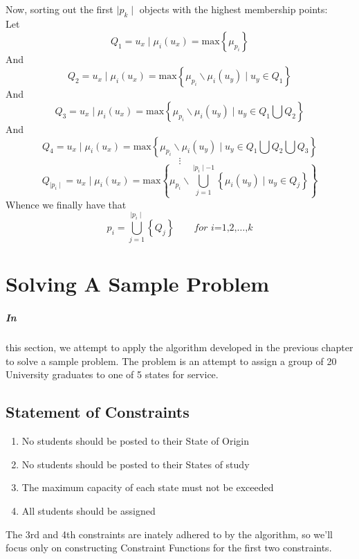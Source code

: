 \documentclass[a4paper]{book}
\begin{document}
		\paragraph{}
			Now, sorting out the first $\mid p_k \mid$ objects with the highest membership points:\\
			Let
				\begin{equation}
					Q_1 = u_x \mid \mu_i(u_x) = \text{max}\left\{ \mu_{p_i} \right\}
				\end{equation}
			And
				\begin{equation}
					Q_2 = u_x \mid \mu_i(u_x) = \text{max}\left\{ \mu_{p_i} \backslash \mu_i(u_y) \mid u_y \in Q_1 \right\}
				\end{equation}
			And
				\begin{equation}
					Q_3 = u_x \mid \mu_i(u_x) = \text{max}\left\{ \mu_{p_i} \backslash \mu_i(u_y) \mid u_y \in Q_1 \bigcup Q_2 \right\}
				\end{equation}
			And
				\begin{equation}
					Q_4 = u_x \mid \mu_i(u_x) = \text{max}\left\{ \mu_{p_i} \backslash \mu_i(u_y) \mid u_y \in Q_1 \bigcup Q_2 \bigcup Q_3 \right\}
				\end{equation}
				\[
					\vdots
				\]
				\begin{equation}
					Q_{\mid p_i \mid} = u_x \mid \mu_i(u_x) = \text{max}\left\{ \mu_{p_i} \backslash \bigcup_{j=1}^{\mid p_i \mid - 1} \left\{  \mu_i(u_y) \mid u_y \in Q_j \right\} \right\}
				\end{equation}
			Whence we finally have that
				\begin{equation}
					p_i = \bigcup_{j=1}^{\mid p_i \mid}\left\{Q_j\right\} \qquad \textit{for i=1,2,}\dots\text{,}k
				\end{equation}
	\chapter{Solving A Sample Problem}
		\paragraph{In}
			this section, we attempt to apply the algorithm developed in the previous chapter to solve a sample problem. The problem is an attempt to assign a group of 20 University graduates to one of 5 states for service.
		
		\section{Statement of Constraints}
			\begin{enumerate}
				\item No students should be posted to their State of Origin
				\item No students should be posted to their States of study
				\item The maximum capacity of each state must not be exceeded
				\item All students should be assigned
			\end{enumerate}
			The 3rd and 4th constraints are inately adhered to by the algorithm, so we'll focus only on constructing Constraint Functions for the first two constraints.
\end{document}
